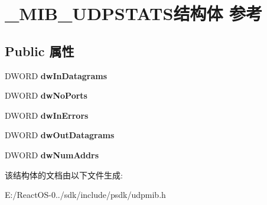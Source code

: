 \hypertarget{struct___m_i_b___u_d_p_s_t_a_t_s}{}\section{\+\_\+\+M\+I\+B\+\_\+\+U\+D\+P\+S\+T\+A\+T\+S结构体 参考}
\label{struct___m_i_b___u_d_p_s_t_a_t_s}
\subsection*{Public 属性}
\begin{DoxyCompactItemize}
\item 
\mbox{\label{struct___m_i_b___u_d_p_s_t_a_t_s_a55e1f2b8fa5ba660a6db241880721488}} 
D\+W\+O\+RD {\bfseries dw\+In\+Datagrams}
\item 
\mbox{\label{struct___m_i_b___u_d_p_s_t_a_t_s_a7bb18abcbd88ba600a4105785babac9b}} 
D\+W\+O\+RD {\bfseries dw\+No\+Ports}
\item 
\mbox{\label{struct___m_i_b___u_d_p_s_t_a_t_s_aea35a6672fb223e8f857c9e9ebf0a187}} 
D\+W\+O\+RD {\bfseries dw\+In\+Errors}
\item 
\mbox{\label{struct___m_i_b___u_d_p_s_t_a_t_s_a034c34ee16bd3dd32137799dc19fc57f}} 
D\+W\+O\+RD {\bfseries dw\+Out\+Datagrams}
\item 
\mbox{\label{struct___m_i_b___u_d_p_s_t_a_t_s_ab307f4afce6cacf3128debe9740ff115}} 
D\+W\+O\+RD {\bfseries dw\+Num\+Addrs}
\end{DoxyCompactItemize}


该结构体的文档由以下文件生成\+:\begin{DoxyCompactItemize}
\item 
E\+:/\+React\+O\+S-\/0../sdk/include/psdk/udpmib.\+h\end{DoxyCompactItemize}
